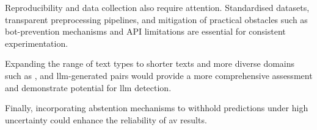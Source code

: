 Reproducibility and data collection also require attention. Standardised datasets, transparent preprocessing pipelines, and mitigation of practical obstacles such as bot-prevention mechanisms and API limitations are essential for consistent experimentation.

Expanding the range of text types to shorter texts and more diverse domains such as \dataPan{}, and \ac{llm}-generated pairs would provide a more comprehensive assessment and demonstrate potential for \ac{llm} detection.

Finally, incorporating abstention mechanisms to withhold predictions under high uncertainty could enhance the reliability of \ac{av} results.

